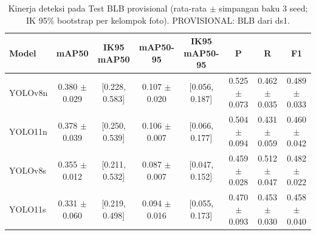 \begin{table}[!t]
\centering
\caption{Kinerja deteksi pada Test BLB provisional (rata-rata $\pm$ simpangan baku 3 seed; IK 95\% bootstrap per kelompok foto). PROVISIONAL: BLB dari ds1.}
\label{tab:utama_test_blb_provisional}
\footnotesize
\begin{tabular}{lccccccc}
\hline
\textbf{Model} & \textbf{mAP50} & \textbf{IK95 mAP50} & \textbf{mAP50-95} & \textbf{IK95 mAP50-95} & \textbf{P} & \textbf{R} & \textbf{F1} \\
\hline
YOLOv8n & 0.380 $\pm$ 0.029 & [0.228, 0.583] & 0.107 $\pm$ 0.020 & [0.056, 0.187] & 0.525 $\pm$ 0.073 & 0.462 $\pm$ 0.035 & 0.489 $\pm$ 0.033 \\
YOLO11n & 0.378 $\pm$ 0.039 & [0.250, 0.539] & 0.106 $\pm$ 0.007 & [0.066, 0.177] & 0.504 $\pm$ 0.094 & 0.431 $\pm$ 0.059 & 0.460 $\pm$ 0.042 \\
YOLOv8s & 0.355 $\pm$ 0.012 & [0.211, 0.532] & 0.087 $\pm$ 0.007 & [0.047, 0.152] & 0.459 $\pm$ 0.028 & 0.512 $\pm$ 0.047 & 0.482 $\pm$ 0.022 \\
YOLO11s & 0.331 $\pm$ 0.060 & [0.219, 0.498] & 0.094 $\pm$ 0.016 & [0.055, 0.173] & 0.470 $\pm$ 0.093 & 0.453 $\pm$ 0.030 & 0.458 $\pm$ 0.040 \\
\hline
\end{tabular}
\end{table}
